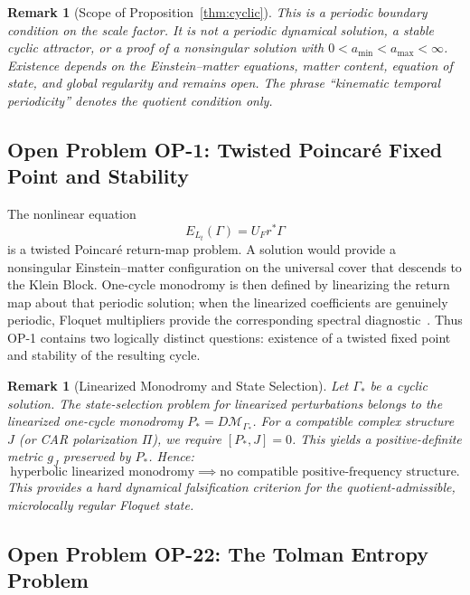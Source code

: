 \documentclass[11pt]{article}
\theoremstyle{canonmath}
\newtheorem{remark}[theorem]{Remark}
\theoremstyle{canonpostulate}
\theoremstyle{canonclaim}
\def\mathcal#1{#1}%
\begin{document}
\begin{remark}[Scope of Proposition~\ref{thm:cyclic}]
This is a periodic boundary condition on the scale factor. It is not a periodic dynamical solution, a stable cyclic attractor, or a proof of a nonsingular solution with $0<a_{\min}<a_{\max}<\infty$. Existence depends on the Einstein--matter equations, matter content, equation of state, and global regularity and remains open. The phrase ``kinematic temporal periodicity'' denotes the quotient condition only.
\end{remark}

\subsection{Open Problem OP-1: Twisted Poincar\'e Fixed Point and Stability}

The nonlinear equation
\begin{equation}
\mathcal E_{L_t}(\Gamma)=U_F r^*\Gamma
\end{equation}
is a twisted Poincar\'e return-map problem. A solution would provide a nonsingular Einstein--matter configuration on the universal cover that descends to the Klein Block. One-cycle monodromy is then defined by linearizing the return map about that periodic solution; when the linearized coefficients are genuinely periodic, Floquet multipliers provide the corresponding spectral diagnostic~\cite{ChiconeODE, Floquet}. Thus OP-1 contains two logically distinct questions: existence of a twisted fixed point and stability of the resulting cycle.

\begin{remark}[Linearized Monodromy and State Selection] \label{rem:monodromy}
Let $\Gamma_*$ be a cyclic solution. The state-selection problem for linearized perturbations belongs to the linearized one-cycle monodromy $P_* = D\mathscr{M}_{\Gamma_*}$. For a compatible complex structure $J$ (or CAR polarization $\Pi$), we require $[P_*, J] = 0$. This yields a positive-definite metric $g_J$ preserved by $P_*$. Hence:
\begin{equation}
\text{hyperbolic linearized monodromy} \implies \text{no compatible positive-frequency structure}.
\end{equation}
This provides a hard dynamical falsification criterion for the quotient-admissible, microlocally regular Floquet state.
\end{remark}

\subsection{Open Problem OP-22: The Tolman Entropy Problem}
\end{document}
